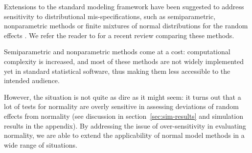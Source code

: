 \documentclass[12pt]{article} %
\newcommand{\hh}[1]{{\color{orange} #1}}
\newcommand{\al}[1]{{\color{red} #1}}
\begin{document}


\hh{Extensions to the standard modeling framework have been suggested to address sensitivity to distributional mis-specifications, such as semiparametric, nonparametric methods \citep{Shen:1999gd, Zhang:2001wo, Ghidey:2004id} or  finite mixtures of normal distributions for the random effects \citep{Verbeke:1996va}. 
}
We refer the reader to \cite{Ghidey:2010de} for a recent review comparing these methods. 

\hh{Semiparametric and nonparametric methods come at a cost: computational complexity is increased, and most of these methods are not widely implemented yet in standard statistical software, thus making them less accessible to the intended audience. }

\hh{However, the situation is not quite as dire as it might seem: it turns out that a lot of tests for normality are overly sensitive in assessing deviations of random effects from normality (see discussion in section~\ref{sec:sim-results} and simulation results in the appendix). By addressing the issue of over-sensitivity in evaluating normality, we are able to extend the applicability of normal model methods in a wide range of situations.}
\end{document}
